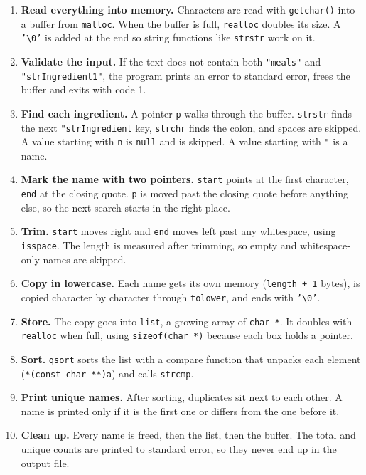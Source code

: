 \documentclass[11pt,a4paper]{article}
\newcommand{\code}[1]{\texttt{#1}}
\begin{document}
\begin{enumerate}[leftmargin=*, itemsep=0.4em]
  \item \textbf{Read everything into memory.} Characters are read with
    \code{getchar()} into a buffer from \code{malloc}. When the buffer is full,
    \code{realloc} doubles its size. A \code{'\textbackslash 0'} is added at the
    end so string functions like \code{strstr} work on it.
  \item \textbf{Validate the input.} If the text does not contain both
    \code{"meals"} and \code{"strIngredient1"}, the program prints an error to
    standard error, frees the buffer and exits with code 1.
  \item \textbf{Find each ingredient.} A pointer \code{p} walks through the
    buffer. \code{strstr} finds the next \code{"strIngredient} key,
    \code{strchr} finds the colon, and spaces are skipped. A value starting with
    \code{n} is \code{null} and is skipped. A value starting with \code{"} is a
    name.
  \item \textbf{Mark the name with two pointers.} \code{start} points at the
    first character, \code{end} at the closing quote. \code{p} is moved past
    the closing quote before anything else, so the next search starts in the
    right place.
  \item \textbf{Trim.} \code{start} moves right and \code{end} moves left past
    any whitespace, using \code{isspace}. The length is measured after
    trimming, so empty and whitespace-only names are skipped.
  \item \textbf{Copy in lowercase.} Each name gets its own memory
    (\code{length + 1} bytes), is copied character by character through
    \code{tolower}, and ends with \code{'\textbackslash 0'}.
  \item \textbf{Store.} The copy goes into \code{list}, a growing array of
    \code{char *}. It doubles with \code{realloc} when full, using
    \code{sizeof(char *)} because each box holds a pointer.
  \item \textbf{Sort.} \code{qsort} sorts the list with a compare function that
    unpacks each element (\code{*(const char **)a}) and calls \code{strcmp}.
  \item \textbf{Print unique names.} After sorting, duplicates sit next to each
    other. A name is printed only if it is the first one or differs from the
    one before it.
  \item \textbf{Clean up.} Every name is freed, then the list, then the buffer.
    The total and unique counts are printed to standard error, so they never
    end up in the output file.
\end{enumerate}
\end{document}
